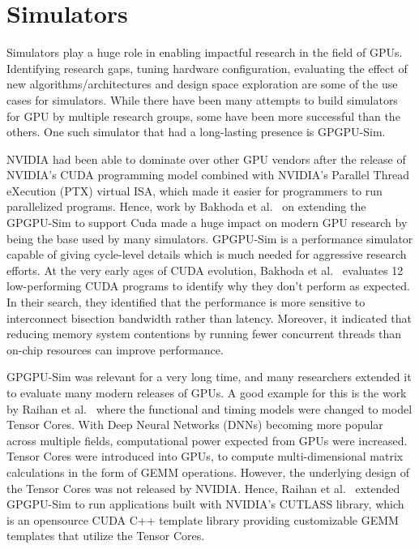 \section{Simulators}

Simulators play a huge role in enabling impactful research in the field of GPUs.
Identifying research gaps, tuning hardware configuration, evaluating the effect of new algorithms/architectures and design space exploration are some of the use cases for simulators.
While there have been many attempts to build simulators for GPU by multiple research groups, some have been more successful than the others.
One such simulator that had a long-lasting presence is GPGPU-Sim.

NVIDIA had been able to dominate over other GPU vendors after the release of NVIDIA's CUDA programming model combined with NVIDIA's Parallel Thread eXecution (PTX) virtual ISA, which made it easier for programmers to run parallelized programs.
Hence, work by Bakhoda et al.~\cite{Bakhoda2009} on extending the GPGPU-Sim to support Cuda made a huge impact on modern GPU research by being the base used by many simulators.
GPGPU-Sim is a performance simulator capable of giving cycle-level details which is much needed for aggressive research efforts.
At the very early ages of CUDA evolution, Bakhoda et al.~\cite{Bakhoda2009} evaluates 12 low-performing CUDA programs to identify why they don't perform as expected.
In their search, they identified that the performance is more sensitive to interconnect bisection bandwidth rather than latency.
Moreover, it indicated that reducing memory system contentions by running fewer concurrent threads than on-chip resources can improve performance.

GPGPU-Sim was relevant for a very long time, and many researchers extended it to evaluate many modern releases of GPUs.
A good example for this is the work by Raihan et al.~\cite{Raihan2018} where the functional and timing models were changed to model Tensor Cores.
With Deep Neural Networks (DNNs) becoming more popular across multiple fields, computational power expected from GPUs were increased.
Tensor Cores were introduced into GPUs, to compute multi-dimensional matrix calculations in the form of GEMM operations.
However, the underlying design of the Tensor Cores was not released by NVIDIA.
Hence, Raihan et al.~\cite{Raihan2018} extended GPGPU-Sim to run applications built with NVIDIA’s CUTLASS library, which is an opensource CUDA C++ template library providing customizable GEMM templates that utilize the Tensor Cores.

